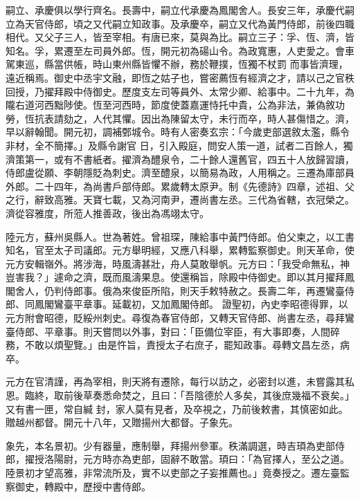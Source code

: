 \begin{pinyinscope}
 嗣立、承慶俱以學行齊名。長壽中，嗣立代承慶為鳳閣舍人。長安三年，承慶代嗣立為天官侍郎，頃之又代嗣立知政事。及承慶卒，嗣立又代為黃門侍郎，前後四職相代。又父子三人，皆至宰相。有唐已來，莫與為比。嗣立三子：孚、恆、濟，皆知名。孚，累遷至左司員外郎。恆，開元初為碭山令。為政寬惠，人吏愛之。會車駕東巡，縣當供帳，時山東州縣皆懼不辦，務於鞭撲，恆獨不杖罰
 而事皆濟理，遠近稱焉。御史中丞宇文融，即恆之姑子也，嘗密薦恆有經濟之才，請以己之官秩回授，乃擢拜殿中侍御史。歷度支左司等員外、太常少卿、給事中。二十九年，為隴右道河西黜陟使。恆至河西時，節度使蓋嘉運恃托中貴，公為非法，兼偽敘功勞，恆抗表請劾之，人代其懼。因出為陳留太守，未行而卒，時人甚傷惜之。濟，早以辭翰聞。開元初，調補鄄城令。時有人密奏玄宗：「今歲吏部選敘太濫，縣令非材，全不簡擇。」及縣令謝官
 日，引入殿庭，問安人策一道，試者二百餘人，獨濟策第一，或有不書紙者。擢濟為醴泉令，二十餘人還舊官，四五十人放歸習讀，侍郎盧從願、李朝隱貶為刺史。濟至醴泉，以簡易為政，人用稱之。三遷為庫部員外郎。二十四年，為尚書戶部侍郎。累歲轉太原尹。制《先德詩》四章，述祖、父之行，辭致高雅。天寶七載，又為河南尹，遷尚書左丞。三代為省轄，衣冠榮之。濟從容雅度，所蒞人推善政，後出為馮翊太守。



 陸元方，蘇州吳縣人。世為著姓。曾祖琛，陳給事中黃門侍郎。伯父柬之，以工書知名，官至太子司議郎。元方舉明經，又應八科舉，累轉監察御史。則天革命，使元方安輯嶺外。將涉海，時風濤甚壯，舟人莫敢舉帆。元方曰：「我受命無私，神豈害我？」遽命之濟，既而風濤果息。使還稱旨，除殿中侍御史。即以其月擢拜鳳閣舍人，仍判侍郎事。俄為來俊臣所陷，則天手敕特赦之。長壽二年，再遷鸞臺侍郎、同鳳閣鸞臺平章事。延載初，又加鳳閣侍郎。
 證聖初，內史李昭德得罪，以元方附會昭德，貶綏州刺史。尋復為春官侍郎，又轉天官侍郎、尚書左丞，尋拜鸞臺侍郎、平章事。則天嘗問以外事，對曰：「臣備位宰臣，有大事即奏，人間碎務，不敢以煩聖覽。」由是忤旨，責授太子右庶子，罷知政事。尋轉文昌左丞，病卒。



 元方在官清謹，再為宰相，則天將有遷除，每行以訪之，必密封以進，未嘗露其私恩。臨終，取前後草奏悉命焚之，且曰：「吾陰德於人多矣，其後庶幾福不衰矣。」又有書一匣，常自緘
 封，家人莫有見者，及卒視之，乃前後敕書，其慎密如此。贈越州都督。開元十八年，又贈揚州大都督。子象先。



 象先，本名景初。少有器量，應制舉，拜揚州參軍。秩滿調選，時吉頊為吏部侍郎，擢授洛陽尉，元方時亦為吏部，固辭不敢當。頊曰：「為官擇人，至公之道。陸景初才望高雅，非常流所及，實不以吏部之子妄推薦也。」竟奏授之。遷左臺監察御史，轉殿中，歷授中書侍郎。




\end{pinyinscope}
